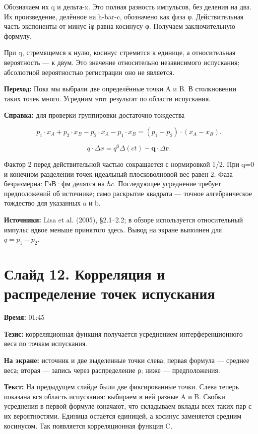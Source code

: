 \documentclass[11pt,a4paper]{article}
\newcommand{\hc}{\hbar c}
\begin{document}
Обозначаем их q и дельта-x. Это полная разность импульсов, без деления на два. Их произведение, делённое на h-bar-c, обозначено как фаза φ. Действительная часть экспоненты от минус iφ равна косинусу φ. Получаем заключительную формулу.

При q, стремящемся к нулю, косинус стремится к единице, а относительная вероятность — к двум. Это значение относительно независимого испускания; абсолютной вероятностью регистрации оно не является.

\textbf{Переход:} Пока мы выбрали две определённые точки A и B. В столкновении таких точек много. Усредним этот результат по области испускания.

\textbf{Справка:} для проверки группировки достаточно тождества

\[p_1\cdot x_A+p_2\cdot x_B-p_2\cdot x_A-p_1\cdot x_B=(p_1-p_2)\cdot(x_A-x_B).\]

\[q\cdot\Delta x=q^0\Delta(ct)-\mathbf q\cdot\Delta\mathbf r.\]

Фактор 2 перед действительной частью сокращается с нормировкой 1/2. При q=0 и конечном разделении точек идеальный плосковолновой вес равен 2. Фаза безразмерна: ГэВ·фм делятся на \(\hc\). Последующее усреднение требует предположений об источнике; само раскрытие квадрата — точное алгебраическое тождество для указанных a и b.

\textbf{Источники:} Lisa et al. (2005), §2.1–2.2; в обзоре используется относительный импульс вдвое меньше принятого здесь. Вывод на экране выполнен для \(q=p_1-p_2\).

\clearpage
\section*{Слайд 12. Корреляция и распределение точек испускания}
\textbf{Время:} 01:45

\textbf{Тезис:} корреляционная функция получается усреднением интерференционного веса по точкам испускания.

\textbf{На экране:} источник и две выделенные точки слева; первая формула — среднее веса; вторая — запись через распределение ρ; ниже — предположения.

\textbf{Текст:} На предыдущем слайде были две фиксированные точки. Слева теперь показана вся область испускания: выбираем в ней разные A и B. Скобки усреднения в первой формуле означают, что складываем вклады всех таких пар с их вероятностями. Единица остаётся единицей, а косинус заменяется средним косинусом. Так появляется корреляционная функция C.
\end{document}
